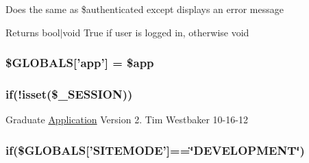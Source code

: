 Does the same as \$authenticated except displays an error message

\begin{DoxyReturn}{Returns}
bool$|$void True if user is logged in, otherwise void 
\end{DoxyReturn}
\hypertarget{routes_8php_a100fbd0f04e9486463c95de08082748a}{
\subsubsection[{\$\-G\-L\-O\-B\-A\-L\-S}]{\setlength{\rightskip}{0pt plus 5cm}\$G\-L\-O\-B\-A\-L\-S\mbox{[}'app'\mbox{]} = \$app}}\label{routes_8php_a100fbd0f04e9486463c95de08082748a}
\hypertarget{routes_8php_a8ceca98aa29914fd2479a84a8d2242fb}{
\subsubsection[{if}]{\setlength{\rightskip}{0pt plus 5cm}if(!isset(\$\-\_\-\-S\-E\-S\-S\-I\-O\-N))}}\label{routes_8php_a8ceca98aa29914fd2479a84a8d2242fb}
Graduate \hyperlink{class_application}{Application} Version 2.  Tim Westbaker  10-\/16-\/12 \hypertarget{routes_8php_ada8b82c576630babb3a1cb52195d42e4}{
\subsubsection[{if}]{\setlength{\rightskip}{0pt plus 5cm}if(\$G\-L\-O\-B\-A\-L\-S\mbox{[}'S\-I\-T\-E\-M\-O\-D\-E'\mbox{]}==\char`\"{}D\-E\-V\-E\-L\-O\-P\-M\-E\-N\-T\char`\"{})}}\label{routes_8php_ada8b82c576630babb3a1cb52195d42e4}
